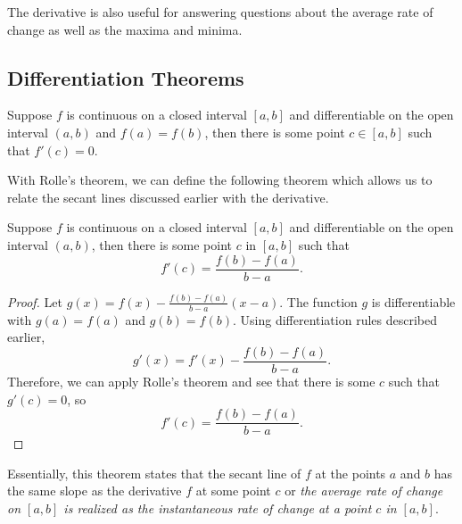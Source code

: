 The derivative is also useful for answering questions about the average rate of change as well as the maxima and minima.


\subsection{Differentiation Theorems}

\begin{thm}
Suppose $f$ is continuous on a closed interval $[a,b]$ and differentiable on the open interval $(a,b)$ and $f(a)=f(b)$, then there is some point $c\in [a,b]$ such that $f'(c)=0$.
\end{thm}

With Rolle's theorem, we can define the following theorem which allows us to relate the secant lines discussed earlier with the derivative.
\begin{thm}\label{MVTD}
Suppose $f$ is continuous on a closed interval $[a,b]$ and differentiable on the open interval $(a,b)$, then there is some point $c$ in $[a,b]$ such that
\begin{equation}
	f'(c)=\frac{f(b)-f(a)}{b-a}.
\end{equation}
\end{thm}
\begin{proof}
Let $g(x)=f(x)-\frac{f(b)-f(a)}{b-a}(x-a)$. The function $g$ is differentiable with $g(a)=f(a)$ and $g(b)=f(b)$. Using differentiation rules described earlier,
\begin{equation}
	g'(x)=f'(x)-\frac{f(b)-f(a)}{b-a}.
\end{equation}
Therefore, we can apply Rolle's theorem and see that there is some $c$ such that $g'(c)=0$, so
\begin{equation}
	f'(c)=\frac{f(b)-f(a)}{b-a}.
\end{equation}
\end{proof}

Essentially, this theorem states that the secant line of $f$ at the points $a$ and $b$ has the same slope as the derivative $f$ at some point $c$ or \emph{the average rate of change on $[a,b]$ is realized as the instantaneous rate of change at a point $c$ in $[a,b]$}.

